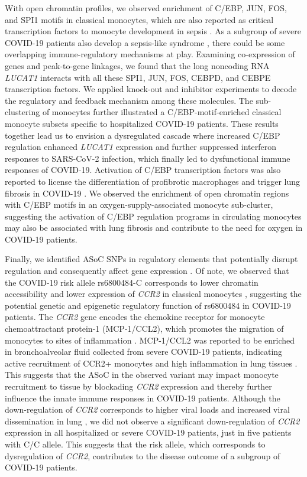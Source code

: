 \documentclass{book}
\begin{document}
\begin{refsection}
With open chromatin profiles, we observed enrichment of C/EBP, JUN, FOS, and SPI1 motifs in classical monocytes, which are also reported as critical transcription factors to monocyte development in sepsis \cite{Reyes2020An}.
As a subgroup of severe COVID-19 patients also develop a sepsis-like syndrome \cite{Reyes2021Plasma,Adams2020Single,Webb2020Clinical}, there could be some overlapping immune-regulatory mechanisms at play.
Examining co-expression of genes and peak-to-gene linkages, we found that the long noncoding RNA \textit{LUCAT1} interacts with all these SPI1, JUN, FOS, CEBPD, and CEBPE transcription factors.
We applied knock-out and inhibitor experiments to decode the regulatory and feedback mechanism among these molecules.
The sub-clustering of monocytes further illustrated a C/EBP-motif-enriched classical monocyte subsets specific to hospitalized COVID-19 patients.
These results together lead us to envision a dysregulated cascade where increased C/EBP regulation enhanced \textit{LUCAT1} expression and further suppressed interferon responses to SARS-CoV-2 infection, which finally led to dysfunctional immune responses of COVID-19.
Activation of C/EBP transcription factors was also reported to license the differentiation of profibrotic macrophages and trigger lung fibrosis in COVID-19 \cite{Wendisch2021SARS}.
We observed the enrichment of open chromatin regions with C/EBP motifs in an oxygen-supply-associated monocyte sub-cluster, suggesting the activation of C/EBP regulation programs in circulating monocytes may also be associated with lung fibrosis and contribute to the need for oxygen in COVID-19 patients.

Finally, we identified ASoC SNPs in regulatory elements that potentially disrupt regulation and consequently affect gene expression \cite{Zhang2020Allele,Atak2021Interpretation}.
Of note, we observed that the COVID-19 risk allele rs6800484-C corresponds to lower chromatin accessibility and lower expression of \textit{CCR2} in classical monocytes \cite{Pairo2020Genetic}, suggesting the potential genetic and epigenetic regulatory function of rs6800484 in COVID-19 patients.
The \textit{CCR2} gene encodes the chemokine receptor for monocyte chemoattractant protein-1 (MCP-1/CCL2), which promotes the migration of monocytes to sites of inflammation \cite{Ginhoux2014Monocytes,Serbina2006Monocyte}.
MCP-1/CCL2 was reported to be enriched in bronchoalveolar fluid collected from severe COVID-19 patients, indicating active recruitment of CCR2+ monocytes and high inflammation in lung tissues \cite{Zhou2020Heightened}.
This suggests that the ASoC in the observed variant may impact monocyte recruitment to tissue by blockading \textit{CCR2} expression and thereby further influence the innate immune responses in COVID-19 patients.
Although the down-regulation of \textit{CCR2} corresponds to higher viral loads and increased viral dissemination in lung \cite{Vanderheiden2021CCR2}, we did not observe a significant down-regulation of \textit{CCR2} expression in all hospitalized or severe COVID-19 patients, just in five patients with C/C allele.
This suggests that the risk allele, which corresponds to dysregulation of \textit{CCR2}, contributes to the disease outcome of a subgroup of COVID-19 patients.


\end{refsection}
\end{document}

